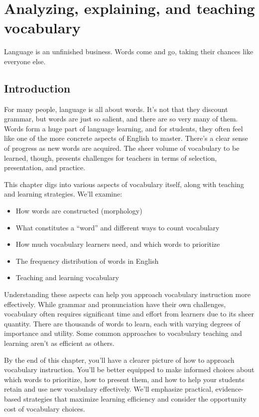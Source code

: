 \chapter{Analyzing, explaining, and teaching vocabulary} \label{ch:vocabulary}

\epigraph{Language is an unfinished business. Words come and go, taking their chances like everyone else.}{}

\section{Introduction} \label{sec:intro}

For many people, language is all about words. It's not that they discount grammar, but words are just so salient, and there are so very many of them. Words form a huge part of language learning, and for students, they often feel like one of the more concrete aspects of English to master. There's a clear sense of progress as new words are acquired. The sheer volume of vocabulary to be learned, though, presents challenges for teachers in terms of selection, presentation, and practice.

This chapter digs into various aspects of vocabulary itself, along with teaching and learning strategies. We'll examine:

\begin{itemize}
\item How words are constructed (morphology)
\item What constitutes a ``word'' and different ways to count vocabulary
\item How much vocabulary learners need, and which words to prioritize
\item The frequency distribution of words in English
\item Teaching and learning vocabulary
\end{itemize}

Understanding these aspects can help you approach vocabulary instruction more effectively. While grammar and pronunciation have their own challenges, vocabulary often requires significant time and effort from learners due to its sheer quantity. There are thousands of words to learn, each with varying degrees of importance and utility. Some common approaches to vocabulary teaching and learning aren't as efficient as others.

By the end of this chapter, you'll have a clearer picture of how to approach vocabulary instruction. You'll be better equipped to make informed choices about which words to prioritize, how to present them, and how to help your students retain and use new vocabulary effectively. We'll emphasize practical, evidence-based strategies that maximize learning efficiency and consider the opportunity cost of vocabulary choices.

